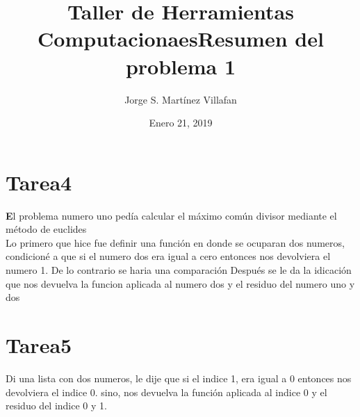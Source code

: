 \documentclass[letterpaper, 12pt, oneside]{article}%
\title{\Huge Taller de Herramientas Computacionaes}
\author{Jorge S. Martínez Villafan}
\date{Enero 21, 2019}
\begin{document}
\maketitle
\newpage
\title{Resumen del problema 1}
\section{Tarea4}
\textbf El problema numero uno pedía calcular el máximo común divisor mediante el método de euclides\\
Lo primero que hice fue definir una función en donde se ocuparan dos numeros, condicioné a que si el numero dos era igual a cero entonces nos devolviera el numero 1. De lo contrario se haria una comparación
Después se le da la idicación que nos devuelva la funcion aplicada al numero dos y el residuo del numero uno y dos

\section{Tarea5}
Di una lista con dos numeros, le dije que si el indice 1, era igual a 0 entonces nos devolviera el indice 0. sino, nos devuelva la función aplicada al indice 0 y el residuo del indice 0 y 1. 
\end{document}
